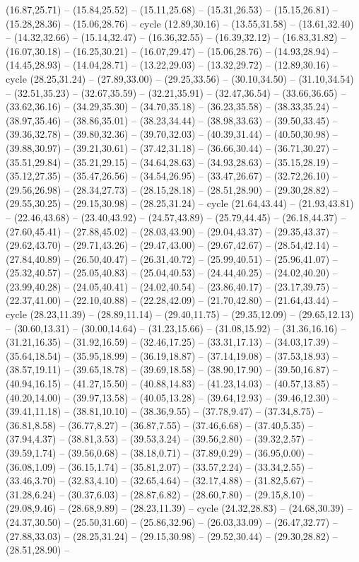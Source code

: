 {(16.87,25.71) -- (15.84,25.52) -- (15.11,25.68) -- (15.31,26.53) -- (15.15,26.81) -- (15.28,28.36) -- (15.06,28.76) -- cycle (12.89,30.16) -- (13.55,31.58) -- (13.61,32.40) -- (14.32,32.66) -- (15.14,32.47) -- (16.36,32.55) -- (16.39,32.12) -- (16.83,31.82) -- (16.07,30.18) -- (16.25,30.21) -- (16.07,29.47) -- (15.06,28.76) -- (14.93,28.94) -- (14.45,28.93) -- (14.04,28.71) -- (13.22,29.03) -- (13.32,29.72) -- (12.89,30.16) -- cycle (28.25,31.24) -- (27.89,33.00) -- (29.25,33.56) -- (30.10,34.50) -- (31.10,34.54) -- (32.51,35.23) -- (32.67,35.59) -- (32.21,35.91) -- (32.47,36.54) -- (33.66,36.65) -- (33.62,36.16) -- (34.29,35.30) -- (34.70,35.18) -- (36.23,35.58) -- (38.33,35.24) -- (38.97,35.46) -- (38.86,35.01) -- (38.23,34.44) -- (38.98,33.63) -- (39.50,33.45) -- (39.36,32.78) -- (39.80,32.36) -- (39.70,32.03) -- (40.39,31.44) -- (40.50,30.98) -- (39.88,30.97) -- (39.21,30.61) -- (37.42,31.18) -- (36.66,30.44) -- (36.71,30.27) -- (35.51,29.84) -- (35.21,29.15) -- (34.64,28.63) -- (34.93,28.63) -- (35.15,28.19) -- (35.12,27.35) -- (35.47,26.56) -- (34.54,26.95) -- (33.47,26.67) -- (32.72,26.10) -- (29.56,26.98) -- (28.34,27.73) -- (28.15,28.18) -- (28.51,28.90) -- (29.30,28.82) -- (29.55,30.25) -- (29.15,30.98) -- (28.25,31.24) -- cycle (21.64,43.44) -- (21.93,43.81) -- (22.46,43.68) -- (23.40,43.92) -- (24.57,43.89) -- (25.79,44.45) -- (26.18,44.37) -- (27.60,45.41) -- (27.88,45.02) -- (28.03,43.90) -- (29.04,43.37) -- (29.35,43.37) -- (29.62,43.70) -- (29.71,43.26) -- (29.47,43.00) -- (29.67,42.67) -- (28.54,42.14) -- (27.84,40.89) -- (26.50,40.47) -- (26.31,40.72) -- (25.99,40.51) -- (25.96,41.07) -- (25.32,40.57) -- (25.05,40.83) -- (25.04,40.53) -- (24.44,40.25) -- (24.02,40.20) -- (23.99,40.28) -- (24.05,40.41) -- (24.02,40.54) -- (23.86,40.17) -- (23.17,39.75) -- (22.37,41.00) -- (22.10,40.88) -- (22.28,42.09) -- (21.70,42.80) -- (21.64,43.44) -- cycle (28.23,11.39) -- (28.89,11.14) -- (29.40,11.75) -- (29.35,12.09) -- (29.65,12.13) -- (30.60,13.31) -- (30.00,14.64) -- (31.23,15.66) -- (31.08,15.92) -- (31.36,16.16) -- (31.21,16.35) -- (31.92,16.59) -- (32.46,17.25) -- (33.31,17.13) -- (34.03,17.39) -- (35.64,18.54) -- (35.95,18.99) -- (36.19,18.87) -- (37.14,19.08) -- (37.53,18.93) -- (38.57,19.11) -- (39.65,18.78) -- (39.69,18.58) -- (38.90,17.90) -- (39.50,16.87) -- (40.94,16.15) -- (41.27,15.50) -- (40.88,14.83) -- (41.23,14.03) -- (40.57,13.85) -- (40.20,14.00) -- (39.97,13.58) -- (40.05,13.28) -- (39.64,12.93) -- (39.46,12.30) -- (39.41,11.18) -- (38.81,10.10) -- (38.36,9.55) -- (37.78,9.47) -- (37.34,8.75) -- (36.81,8.58) -- (36.77,8.27) -- (36.87,7.55) -- (37.46,6.68) -- (37.40,5.35) -- (37.94,4.37) -- (38.81,3.53) -- (39.53,3.24) -- (39.56,2.80) -- (39.32,2.57) -- (39.59,1.74) -- (39.56,0.68) -- (38.18,0.71) -- (37.89,0.29) -- (36.95,0.00) -- (36.08,1.09) -- (36.15,1.74) -- (35.81,2.07) -- (33.57,2.24) -- (33.34,2.55) -- (33.46,3.70) -- (32.83,4.10) -- (32.65,4.64) -- (32.17,4.88) -- (31.82,5.67) -- (31.28,6.24) -- (30.37,6.03) -- (28.87,6.82) -- (28.60,7.80) -- (29.15,8.10) -- (29.08,9.46) -- (28.68,9.89) -- (28.23,11.39) -- cycle (24.32,28.83) -- (24.68,30.39) -- (24.37,30.50) -- (25.50,31.60) -- (25.86,32.96) -- (26.03,33.09) -- (26.47,32.77) -- (27.88,33.03) -- (28.25,31.24) -- (29.15,30.98) -- (29.52,30.44) -- (29.30,28.82) -- (28.51,28.90) -- }
